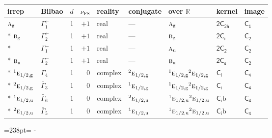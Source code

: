 \documentclass[10pt,a4paper]{article}
\makeatletter
\def\grouprule#1#2{\noalign{\marks\LTgroupmarks{\the\belowrulesep}\nobreak\vskip#1%
  \vskip\aboverulesep}\multispan\LT@cols\unskip{\leaders\hrule\@height#2\hfill\kern\z@}\cr
  \noalign{\penalty\LTrulebreak\vskip\belowrulesep\global\@lastruleclass\z@}}
\newcommand{\needspace}[1]{\par\penalty-100\begingroup\dimen0=#1\relax\dimen2=\pagegoal
  \advance\dimen2-\pagetotal\ifdim\dimen0>\dimen2\relax\ifdim\dimen2>0pt\vfil\break\fi\fi
  \endgroup}
\numberwithin{equation}{section}
\newcommand{\grp}[1]{\mathsf{#1}}
\newcommand{\irr}[1]{\text{\normalfont\scshape #1}}
\newcommand{\conjpair}[1]{{}^{#1}}
\newcommand{\detbox}[1]{{\setlength{\fboxsep}{1pt}\fbox{#1}}}
\newcommand{\ptag}[1]{\mathrm{#1}}
\newcommand{\fsind}{\nu_{\mathrm{FS}}}
\newcommand{\secondclass}{\mathrm{b}}
\makeatother
\begin{document}
{\small\renewcommand{\arraystretch}{1.25}\setlength{\tabcolsep}{4pt}\begin{longtable}{@{}llrrlllll@{}}\toprule
irrep & Bilbao & $d$ & $\fsind$ & reality & conjugate & over $\mathbb{R}$ & kernel & image\\\midrule\endhead
\bottomrule\endfoot\endlastfoot
$\irr{a}_{\ptag{g}}$ & $\Gamma_{1}^{+}$ & 1 & $+1$ & real & --- & $\irr{a}_{\ptag{g}}$ & \href{2C2h.pdf}{$\grp{2C_{2h}}$} & \href{../../../rotation/data/pdf/C1.pdf}{$\grp{C_{1}}$}\\*
$\irr{b}_{\ptag{g}}$ & $\Gamma_{2}^{+}$ & 1 & $+1$ & real & --- & $\irr{b}_{\ptag{g}}$ & \href{2S2.pdf}{$\grp{2C_{i}}$} & \href{../../../rotation/data/pdf/C2.pdf}{$\grp{C_{2}}$}\\*
\detbox{$\irr{a}_{\ptag{u}}$} & $\Gamma_{1}^{-}$ & 1 & $+1$ & real & --- & $\irr{a}_{\ptag{u}}$ & \href{2C2.pdf}{$\grp{2C_{2}}$} & \href{../../../rotation/data/pdf/C2.pdf}{$\grp{C_{2}}$}\\*
$\irr{b}_{\ptag{u}}$ & $\Gamma_{2}^{-}$ & 1 & $+1$ & real & --- & $\irr{b}_{\ptag{u}}$ & \href{2C1v.pdf}{$\grp{2C_{s}}$} & \href{../../../rotation/data/pdf/C2.pdf}{$\grp{C_{2}}$}\\*
\grouprule{0pt}{\lightrulewidth}
$\conjpair{1}\irr{e}_{1/2,\ptag{g}}$ & $\bar{\Gamma}_{4}$ & 1 & $0$ & complex & $\conjpair{2}\irr{e}_{1/2,\ptag{g}}$ & $\conjpair{1}\irr{e}_{1/2,\ptag{g}}\conjpair{2}\irr{e}_{1/2,\ptag{g}}$ & \href{S2.pdf}{$\grp{C_{i}}$} & \href{../../../rotation/data/pdf/C4.pdf}{$\grp{C_{4}}$}\\*
$\conjpair{2}\irr{e}_{1/2,\ptag{g}}$ & $\bar{\Gamma}_{3}$ & 1 & $0$ & complex & $\conjpair{1}\irr{e}_{1/2,\ptag{g}}$ & $\conjpair{1}\irr{e}_{1/2,\ptag{g}}\conjpair{2}\irr{e}_{1/2,\ptag{g}}$ & \href{S2.pdf}{$\grp{C_{i}}$} & \href{../../../rotation/data/pdf/C4.pdf}{$\grp{C_{4}}$}\\*
$\conjpair{1}\irr{e}_{1/2,\ptag{u}}$ & $\bar{\Gamma}_{6}$ & 1 & $0$ & complex & $\conjpair{2}\irr{e}_{1/2,\ptag{u}}$ & $\conjpair{1}\irr{e}_{1/2,\ptag{u}}\conjpair{2}\irr{e}_{1/2,\ptag{u}}$ & \href{S2b.pdf}{$\grp{C_{i}}\secondclass$} & \href{../../../rotation/data/pdf/C4.pdf}{$\grp{C_{4}}$}\\*
$\conjpair{2}\irr{e}_{1/2,\ptag{u}}$ & $\bar{\Gamma}_{5}$ & 1 & $0$ & complex & $\conjpair{1}\irr{e}_{1/2,\ptag{u}}$ & $\conjpair{1}\irr{e}_{1/2,\ptag{u}}\conjpair{2}\irr{e}_{1/2,\ptag{u}}$ & \href{S2b.pdf}{$\grp{C_{i}}\secondclass$} & \href{../../../rotation/data/pdf/C4.pdf}{$\grp{C_{4}}$}\\
\bottomrule\end{longtable}}
\needspace{238pt}
\end{document}
